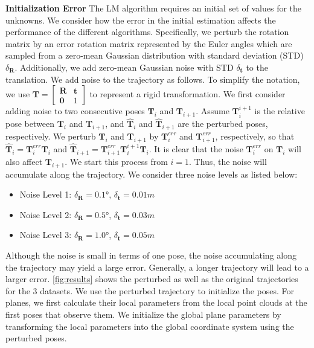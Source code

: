 \documentclass{vgtc}                          %
\begin{document}
\textbf{Initialization Error} \quad The LM algorithm requires an initial set of values for the unknowns.  We consider  how the error in  the initial estimation affects the performance of the different algorithms.  %
Specifically, we perturb the rotation matrix by an error  rotation matrix represented by the Euler angles which are sampled from a zero-mean Gaussian distribution with standard deviation (STD) $\delta_{\mathbf{R}}$. Additionally, we add zero-mean Gaussian noise with STD $\delta_{\mathbf{t}}$ to the translation.  We add  noise to the trajectory as follows. To simplify the notation, we use $\mathbf{T} = \begin{bmatrix}
\mathbf{R} & \mathbf{t} \\
\mathbf{0} & 1
\end{bmatrix}$  to represent a rigid transformation. We first consider adding noise to two consecutive poses $\mathbf{T}_i$ and $\mathbf{T}_{i+1}$.
 Assume $\mathbf{T}_i^{i+1}$ is the relative pose between $\mathbf{T}_i$ and $\mathbf{T}_{i+1}$, and $\hat{\mathbf{T}}_i $ and $\hat{\mathbf{T}}_{i+1}$ are the perturbed poses, respectively. We perturb $\mathbf{T}_i$ and $\mathbf{T}_{i+1}$ by $\mathbf{T}_i^{err}$ and $\mathbf{T}_{i+1}^{err}$, respectively,  so that $\hat{\mathbf{T}}_i = \mathbf{T}_i^{err}\mathbf{T}_i$ and $\hat{\mathbf{T}}_{i+1} = \mathbf{T}_{i+1}^{err}\mathbf{T}_i^{i+1}\hat{\mathbf{T}}_i$. It  is clear that the noise $\mathbf{T}_i^{err}$ on $\mathbf{T}_{i}$ will also affect $\mathbf{T}_{i+1}$. We start this process from $i=1$. Thus, the noise  will accumulate along the trajectory. We consider three noise levels  as listed below:
\begin{itemize}
	\item Noise Level 1: $\delta_{\mathbf{R}} = 0.1$\si{\degree}, $\delta_{\mathbf{t}} = 0.01m$
	\item Noise Level 2: $\delta_{\mathbf{R}} = 0.5$\si{\degree}, $\delta_{\mathbf{t}} = 0.03m$
	\item Noise Level 3: $\delta_{\mathbf{R}} = 1.0$\si{\degree}, $\delta_{\mathbf{t}} = 0.05m$
\end{itemize}
Although the noise is small in terms of one pose, the noise  accumulating along the trajectory  may yield a large error. Generally, a longer trajectory will lead to a larger error. \autoref{fig:results} shows the perturbed as well as  the original trajectories for the 3 datasets. We use the perturbed trajectory to initialize the poses.  For  planes,  we first calculate their local parameters from the local point clouds at the first poses that observe them. We initialize the global plane parameters by transforming the local parameters into the global coordinate system using the perturbed poses.  
\end{document}
